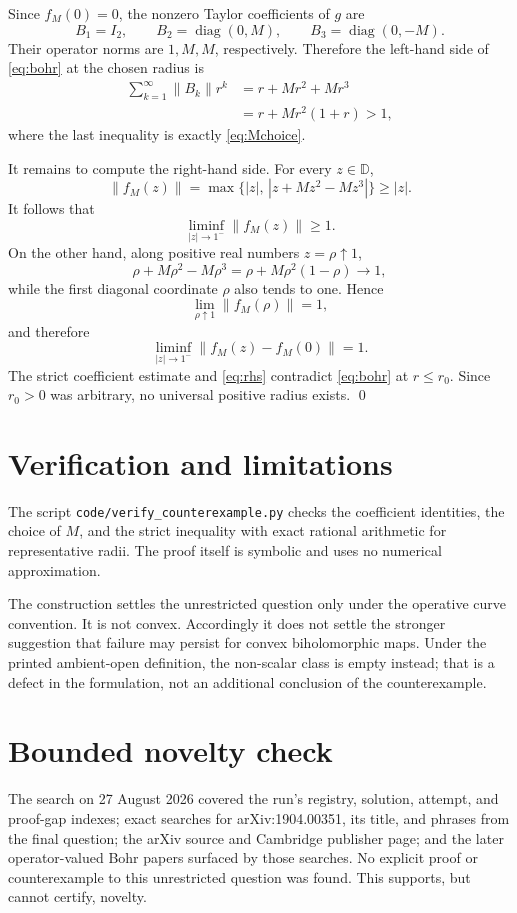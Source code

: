 \documentclass[11pt]{article}
\newcommand{\D}{\mathbb D}
\newcommand{\diag}{\operatorname{diag}}
\begin{document}
Since \(f_M(0)=0\), the nonzero Taylor coefficients of \(g\) are
\[
 B_1=I_2,\qquad
 B_2=\diag(0,M),\qquad
 B_3=\diag(0,-M).
\]
Their operator norms are \(1,M,M\), respectively. Therefore the left-hand
side of \eqref{eq:bohr} at the chosen radius is
\begin{align*}
 \sum_{k=1}^{\infty}\|B_k\|r^k
 &=r+Mr^2+Mr^3\\
 &=r+Mr^2(1+r)>1,
\end{align*}
where the last inequality is exactly \eqref{eq:Mchoice}.

It remains to compute the right-hand side. For every \(z\in\D\),
\[
 \|f_M(z)\|
 =\max\{|z|,\,|z+Mz^2-Mz^3|\}\geq |z|.
\]
It follows that
\[
 \liminf_{|z|\to1^-}\|f_M(z)\|\geq1.
\]
On the other hand, along positive real numbers \(z=\rho\uparrow1\),
\[
 \rho+M\rho^2-M\rho^3
 =\rho+M\rho^2(1-\rho)\longrightarrow1,
\]
while the first diagonal coordinate \(\rho\) also tends to one. Hence
\[
 \lim_{\rho\uparrow1}\|f_M(\rho)\|=1,
\]
and therefore
\begin{equation}\label{eq:rhs}
 \liminf_{|z|\to1^-}\|f_M(z)-f_M(0)\|=1.
\end{equation}
The strict coefficient estimate and \eqref{eq:rhs} contradict
\eqref{eq:bohr} at \(r\leq r_0\). Since \(r_0>0\) was arbitrary, no universal
positive radius exists. \qed

\section{Verification and limitations}

The script \texttt{code/verify\_counterexample.py} checks the coefficient
identities, the choice of \(M\), and the strict inequality with exact rational
arithmetic for representative radii. The proof itself is symbolic and uses no
numerical approximation.

The construction settles the unrestricted question only under the operative
curve convention. It is not convex. Accordingly it does not settle the
stronger suggestion that failure may persist for convex biholomorphic maps.
Under the printed ambient-open definition, the non-scalar class is empty
instead; that is a defect in the formulation, not an additional conclusion of
the counterexample.

\section{Bounded novelty check}

The search on 27 August 2026 covered the run's registry, solution, attempt,
and proof-gap indexes; exact searches for arXiv:1904.00351, its title, and
phrases from the final question; the arXiv source and Cambridge publisher
page; and the later operator-valued Bohr papers surfaced by those searches.
No explicit proof or counterexample to this unrestricted question was found.
This supports, but cannot certify, novelty.
\end{document}
